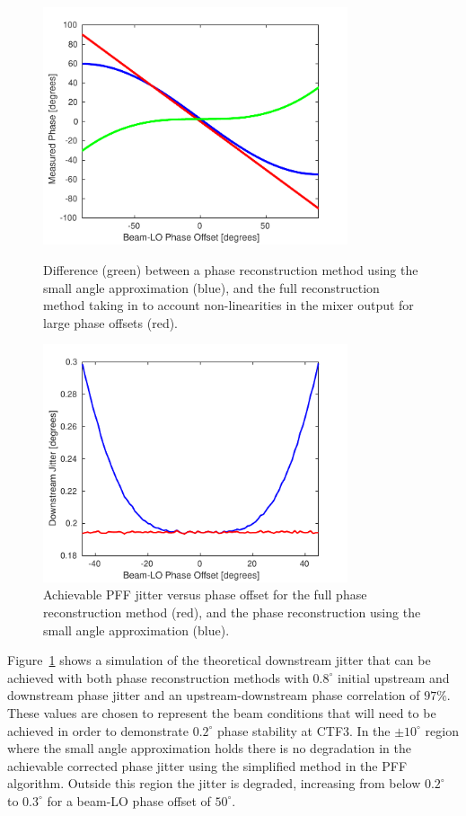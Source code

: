 \begin{figure}
  \centering
  \includegraphics[width=0.8\textwidth]{Figures/commissioning/phaseRecDiff}
  \caption{Difference (green) between a phase reconstruction method using the small angle approximation (blue), and the full reconstruction method taking in to account non-linearities in the mixer output for large phase offsets (red).}
  \label{f:phaseRecDiff}
  \centering
  \includegraphics[width=0.8\textwidth]{Figures/commissioning/phaseRecJitSim}
  \caption{Achievable PFF jitter versus phase offset for the full phase reconstruction method (red), and the phase reconstruction using the small angle approximation (blue).}
  \label{f:phaseRecJitSim}
\end{figure}

Figure~\ref{f:phaseRecJitSim} shows a simulation of the theoretical downstream jitter that can be achieved with both phase reconstruction methods with \(0.8^\circ\) initial upstream and downstream phase jitter and an upstream-downstream phase correlation of \(97\%\). These values are chosen to represent the beam conditions that will need to be achieved in order to demonstrate \(0.2^\circ\) phase stability at CTF3. In the \(\pm10^\circ\) region where the small angle approximation holds there is no degradation in the achievable corrected phase jitter using the simplified method in the PFF algorithm. Outside this region the jitter is degraded, increasing from below \(0.2^\circ\) to \(0.3^\circ\) for a beam-LO phase offset of \(50^\circ\). 

